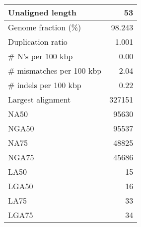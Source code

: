 \documentclass[12pt,a4paper]{article}
\begin{document}
\begin{table}[ht]
\begin{center}
\begin{tabular}{|l*{1}{|r}|}
Unaligned length & 53 \\ \hline
Genome fraction (\%) & 98.243 \\ \hline
Duplication ratio & 1.001 \\ \hline
\# N's per 100 kbp & 0.00 \\ \hline
\# mismatches per 100 kbp & 2.04 \\ \hline
\# indels per 100 kbp & 0.22 \\ \hline
Largest alignment & 327151 \\ \hline
NA50 & 95630 \\ \hline
NGA50 & 95537 \\ \hline
NA75 & 48825 \\ \hline
NGA75 & 45686 \\ \hline
LA50 & 15 \\ \hline
LGA50 & 16 \\ \hline
LA75 & 33 \\ \hline
LGA75 & 34 \\ \hline
\end{tabular}
\end{center}
\end{table}
\end{document}
